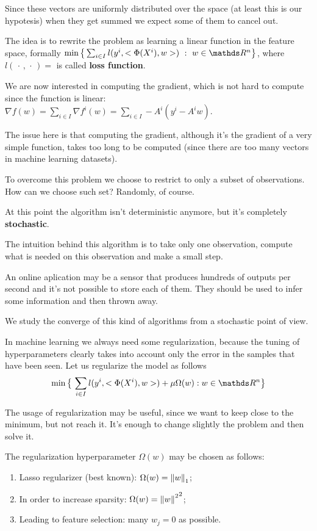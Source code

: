 \documentclass[computationalMathematics.tex]{subfiles}
\begin{document}
Since these vectors are uniformly distributed over the space (at least this is our hypotesis) when they get summed we expect some of them to cancel out.

The idea is to rewrite the problem as learning a linear function in the feature space, formally $\min \big\{\sum_{i \in I} l(y^i,\ps{\Phi(X^i)}{w})~:~w \in \R^n \big\}$, where $l( \, \cdot \,,\, \cdot \, ) =$ is called \textbf{loss function}.

We are now interested in computing the gradient, which is not hard to compute since the function is linear: $\nabla f(w) = \sum_{i \in I} \nabla f^i(w) = \sum_{i \in I} -A^i (y^i - A^i w)$.

The issue here is that computing the gradient, although it's the gradient of a very simple function, takes too long to be computed (since there are too many vectors in machine learning datasets).

To overcome this problem we choose to restrict to only a subset of observations. How can we choose such set? Randomly, of course.

At this point the algorithm isn't deterministic anymore, but it's completely \textbf{stochastic}.

The intuition behind this algorithm is to take only one observation, compute what is needed on this observation and make a small step.

An online aplication may be a sensor that produces hundreds of outputs per second and it's not possible to store each of them. They should be used to infer some information and then thrown away.

We study the converge of this kind of algorithms from a stochastic point of view.

In machine learning we always need some regularization, because the tuning of hyperparameters clearly takes into account only the error in the samples that have been seen. Let us regularize the model as follows
\[
  \min \big\{ \, \sum\limits_{i \in I} l(y^i, \ps{\Phi(X^i)}{w}) + \mu \Omega(w) : w \in \R^n \big\}
\]

The usage of regularization may be useful, since we want to keep close to the minimum, but not reach it. It's enough to change slightly the problem and then solve it.

The regularization hyperparameter $\Omega(w)$ may be chosen as follows:

\begin{enumerate}
  \item Lasso regularizer (best known): $\Omega(w) = {\left\lVert w\right\rVert}_1$;
  \item In order to increase sparsity: $\Omega(w) = {{\left\lVert w\right\rVert}^2}^2$;
  \item Leading to feature selection: many $w_j = 0$ as possible.
\end{enumerate}
\end{document}
